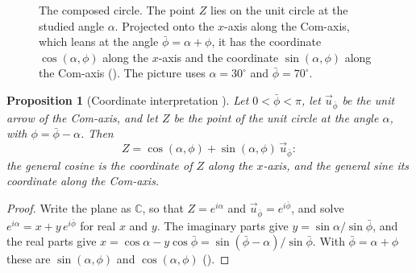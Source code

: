 \documentclass[11pt,a4paper]{amsart}
\theoremstyle{plain}
\newtheorem{proposition}[theorem]{Proposition}
\theoremstyle{definition}
\theoremstyle{remark}
\newcommand{\pb}{\bar{\phi}}                     %
\newcommand{\up}{\vec{u}_{\bar{\phi}}}           %
\newcommand{\C}{\mathbb{C}}
\begin{document}
\begin{figure}[tb]
\centering
{}
\caption{The composed circle. The point $Z$ lies on the unit circle at the studied angle $\alpha$. Projected onto the $x$-axis along the Com-axis, which leans at the angle $\pb = \alpha + \phi$, it has the coordinate $\cos(\alpha, \phi)$ along the $x$-axis and the coordinate $\sin(\alpha, \phi)$ along the Com-axis (). The picture uses $\alpha = 30^\circ$ and $\pb = 70^\circ$.}
\label{fig:composed-circle}
\end{figure}

\begin{proposition}[Coordinate interpretation {\citep[Proposition~4.12]{Derraz2026GSP}}]\label{prop:gs-coordinates}
Let $0 < \pb < \pi$, let $\up$ be the unit arrow of the Com-axis, and let $Z$ be the point of the unit circle at the angle $\alpha$, with $\phi = \pb - \alpha$. Then
\[
Z = \cos(\alpha, \phi) + \sin(\alpha, \phi)\,\up :
\]
the general cosine is the coordinate of $Z$ along the $x$-axis, and the general sine its coordinate along the Com-axis.
\end{proposition}

\begin{proof}
Write the plane as $\C$, so that $Z = e^{i\alpha}$ and $\up = e^{i\pb}$, and solve $e^{i\alpha} = x + y\,e^{i\pb}$ for real $x$ and $y$. The imaginary parts give $y = \sin\alpha/\sin\pb$, and the real parts give $x = \cos\alpha - y\cos\pb = \sin(\pb - \alpha)/\sin\pb$. With $\pb = \alpha + \phi$ these are $\sin(\alpha, \phi)$ and $\cos(\alpha, \phi)$ ().
\end{proof}
\end{document}

